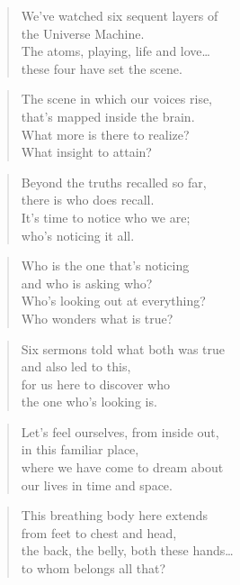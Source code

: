 \documentclass[14pt,a4paper]{article}
\begin{document}
\begin{verse}
We’ve watched six sequent layers of\\
the Universe Machine.\\
The atoms, playing, life and love…\\
these four have set the scene.
\end{verse}

\begin{verse}
The scene in which our voices rise,\\
that’s mapped inside the brain.\\
What more is there to realize?\\
What insight to attain?
\end{verse}

\begin{verse}
Beyond the truths recalled so far,\\
there is who does recall.\\
It’s time to notice who we are;\\
who’s noticing it all.
\end{verse}

\begin{verse}
Who is the one that’s noticing\\
and who is asking who?\\
Who’s looking out at everything?\\
Who wonders what is true?
\end{verse}

\begin{verse}
Six sermons told what both was true\\
and also led to this,\\
for us here to discover who\\
the one who’s looking is.
\end{verse}

\begin{verse}
Let’s feel ourselves, from inside out,\\
in this familiar place,\\
where we have come to dream about\\
our lives in time and space.
\end{verse}

\begin{verse}
This breathing body here extends\\
from feet to chest and head,\\
the back, the belly, both these hands…\\
to whom belongs all that?
\end{verse}
\end{document}

